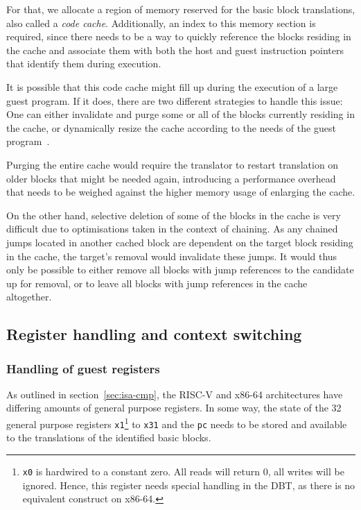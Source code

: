 For that, we allocate a region of memory reserved for the basic block translations, also called a \textit{code cache}.
Additionally, an index to this memory section is required, since there needs to be a way to quickly reference the blocks residing in the cache and associate them with both the host and guest instruction pointers that identify them during execution.


It is possible that this code cache might fill up during the execution of a large guest program.
If it does, there are two different strategies to handle this issue:
One can either invalidate and purge some or all of the blocks currently residing in the cache, or dynamically resize the cache according to the needs of the guest program~\cite[S. 3]{bintrans}.

Purging the entire cache would require the translator to restart translation on older blocks that might be needed again, introducing a performance overhead that needs to be weighed against the higher memory usage of enlarging the cache.

On the other hand, selective deletion of some of the blocks in the cache is very difficult due to optimisations taken in the context of chaining.
As any chained jumps located in another cached block are dependent on the target block residing in the cache, the target's removal would invalidate these jumps.
It would thus only be possible to either remove all blocks with jump references to the candidate up for removal, or to leave all blocks with jump references in the cache altogether.

\subsection{Register handling and context switching}
\label{sec:context-switch-reg-handle}

\subsubsection{Handling of guest registers}
\label{sec:reg-handle}
As outlined in section~\ref{sec:isa-cmp}, the RISC-V and x86-64 architectures have differing amounts of general purpose registers.
In some way, the state of the 32 general purpose registers \texttt{x1}\footnote{\texttt{x0} is hardwired to a constant zero. All reads will return 0, all writes will be ignored. Hence, this register needs special handling in the DBT, as there is no equivalent construct on x86-64.} to \texttt{x31} and the \texttt{pc} needs to be stored and available to the translations of the identified basic blocks.

